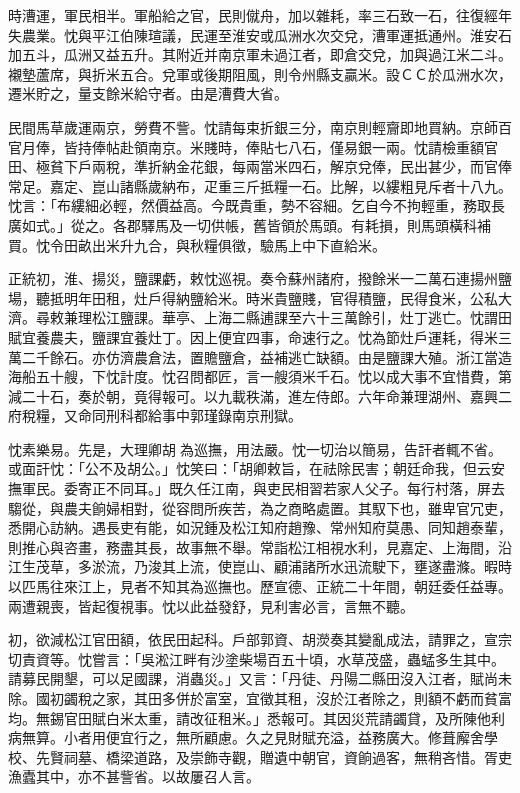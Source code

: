 \begin{pinyinscope}
時漕運，軍民相半。軍船給之官，民則僦舟，加以雜耗，率三石致一石，往復經年失農業。忱與平江伯陳瑄議，民運至淮安或瓜洲水次交兌，漕軍運抵通州。淮安石加五斗，瓜洲又益五升。其附近并南京軍未過江者，即倉交兌，加與過江米二斗。襯墊蘆席，與折米五合。兌軍或後期阻風，則令州縣支贏米。設ＣＣ於瓜洲水次，遷米貯之，量支餘米給守者。由是漕費大省。

民間馬草歲運兩京，勞費不訾。忱請每束折銀三分，南京則輕齎即地買納。京師百官月俸，皆持俸帖赴領南京。米賤時，俸貼七八石，僅易銀一兩。忱請檢重額官田、極貧下戶兩稅，準折納金花銀，每兩當米四石，解京兌俸，民出甚少，而官俸常足。嘉定、崑山諸縣歲納布，疋重三斤抵糧一石。比解，以縷粗見斥者十八九。忱言：「布縷細必輕，然價益高。今既貴重，勢不容細。乞自今不拘輕重，務取長廣如式。」從之。各郡驛馬及一切供帳，舊皆領於馬頭。有耗損，則馬頭橫科補買。忱令田畝出米升九合，與秋糧俱徵，驗馬上中下直給米。

正統初，淮、揚災，鹽課虧，敕忱巡視。奏令蘇州諸府，撥餘米一二萬石連揚州鹽場，聽抵明年田租，灶戶得納鹽給米。時米貴鹽賤，官得積鹽，民得食米，公私大濟。尋敕兼理松江鹽課。華亭、上海二縣逋課至六十三萬餘引，灶丁逃亡。忱謂田賦宜養農夫，鹽課宜養灶丁。因上便宜四事，命速行之。忱為節灶戶運耗，得米三萬二千餘石。亦仿濟農倉法，置贍鹽倉，益補逃亡缺額。由是鹽課大殖。浙江當造海船五十艘，下忱計度。忱召問都匠，言一艘須米千石。忱以成大事不宜惜費，第減二十石，奏於朝，竟得報可。以九載秩滿，進左侍郎。六年命兼理湖州、嘉興二府稅糧，又命同刑科都給事中郭瑾錄南京刑獄。

忱素樂易。先是，大理卿胡為巡撫，用法嚴。忱一切治以簡易，告訐者輒不省。或面訐忱：「公不及胡公。」忱笑曰：「胡卿敕旨，在祛除民害；朝廷命我，但云安撫軍民。委寄正不同耳。」既久任江南，與吏民相習若家人父子。每行村落，屏去騶從，與農夫餉婦相對，從容問所疾苦，為之商略處置。其馭下也，雖卑官冗吏，悉開心訪納。遇長吏有能，如況鍾及松江知府趙豫、常州知府莫愚、同知趙泰輩，則推心與咨畫，務盡其長，故事無不舉。常詣松江相視水利，見嘉定、上海間，沿江生茂草，多淤流，乃浚其上流，使崑山、顧浦諸所水迅流駛下，壅遂盡滌。暇時以匹馬往來江上，見者不知其為巡撫也。歷宣德、正統二十年間，朝廷委任益專。兩遭親喪，皆起復視事。忱以此益發舒，見利害必言，言無不聽。

初，欲減松江官田額，依民田起科。戶部郭資、胡濙奏其變亂成法，請罪之，宣宗切責資等。忱嘗言：「吳淞江畔有沙塗柴場百五十頃，水草茂盛，蟲蜢多生其中。請募民開墾，可以足國課，消蟲災。」又言：「丹徒、丹陽二縣田沒入江者，賦尚未除。國初蠲稅之家，其田多併於富室，宜徵其租，沒於江者除之，則額不虧而貧富均。無錫官田賦白米太重，請改征租米。」悉報可。其因災荒請蠲貸，及所陳他利病無算。小者用便宜行之，無所顧慮。久之見財賦充溢，益務廣大。修葺廨舍學校、先賢祠墓、橋梁道路，及崇飾寺觀，贈遺中朝官，資餉過客，無稍吝惜。胥吏漁蠹其中，亦不甚訾省。以故屢召人言。


\end{pinyinscope}
